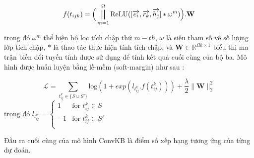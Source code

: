 \begin{equation}
	f(t_{i j k}) = \Big( \bigparallel_{m=1}^{\Omega} \text{ReLU} ([\overrightarrow{e_i}, \overrightarrow{r_k}, \overrightarrow{h_j}] \ast \omega^m)\Big).\mathbf{W}
\end{equation}

trong đó $\omega^m$ thể hiện bộ lọc tích chập thứ $m-th$,
\(\omega\) là siêu tham số về số lượng lớp tích chập, \(\ast\) là thao tác thực hiện tính tích chập, và \(\mathbf{W} \in \mathbb{R}^{\Omega k \times 1}\)
biểu thị ma trận biến đổi tuyến tính được sử dụng để tính kết quả cuối cùng của bộ ba. Mô hình được huấn luyện bằng lề-mềm (soft-margin) như sau :

\begin{equation}
	\label{eq:lossConvKB}
	\mathcal{L} = \sum_{t^k_{ij} \in \{S \cup S'\}} \text{log}(1 + exp(l_{t^k_{ij}} . f(t^k_{ij}))) + \frac{\lambda}{2} \parallel{\mathbf{W}}\parallel_2^2
\end{equation}
trong đó $l_{t^k_{ij}} = \begin{cases}
	1 &\text{for } t^k_{ij} \in S \\
	-1 &\text{for } t^k_{ij} \in S' \\
\end{cases}$

Đầu ra cuối cùng của mô hình ConvKB là điểm số xếp hạng tương ứng của từng dự đoán.
